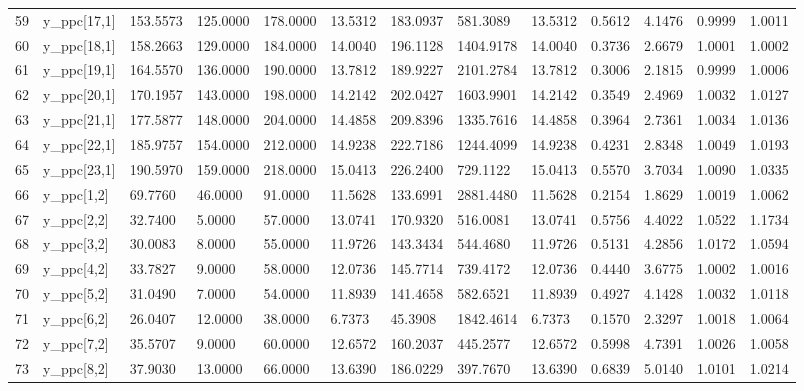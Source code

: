 \begin{table}[ht]
\begin{tabular}{rllllllllllll}
  59 & y\_ppc[17,1] & 153.5573 &  125.0000 & 178.0000 &  13.5312 &   183.0937 &  581.3089 &  13.5312 &  0.5612 &  4.1476 & 0.9999 &  1.0011 \\ 
  60 & y\_ppc[18,1] & 158.2663 &  129.0000 & 184.0000 &  14.0040 &   196.1128 & 1404.9178 &  14.0040 &  0.3736 &  2.6679 & 1.0001 &  1.0002 \\ 
  61 & y\_ppc[19,1] & 164.5570 &  136.0000 & 190.0000 &  13.7812 &   189.9227 & 2101.2784 &  13.7812 &  0.3006 &  2.1815 & 0.9999 &  1.0006 \\ 
  62 & y\_ppc[20,1] & 170.1957 &  143.0000 & 198.0000 &  14.2142 &   202.0427 & 1603.9901 &  14.2142 &  0.3549 &  2.4969 & 1.0032 &  1.0127 \\ 
  63 & y\_ppc[21,1] & 177.5877 &  148.0000 & 204.0000 &  14.4858 &   209.8396 & 1335.7616 &  14.4858 &  0.3964 &  2.7361 & 1.0034 &  1.0136 \\ 
  64 & y\_ppc[22,1] & 185.9757 &  154.0000 & 212.0000 &  14.9238 &   222.7186 & 1244.4099 &  14.9238 &  0.4231 &  2.8348 & 1.0049 &  1.0193 \\ 
  65 & y\_ppc[23,1] & 190.5970 &  159.0000 & 218.0000 &  15.0413 &   226.2400 &  729.1122 &  15.0413 &  0.5570 &  3.7034 & 1.0090 &  1.0335 \\ 
  66 & y\_ppc[1,2] &  69.7760 &   46.0000 &  91.0000 &  11.5628 &   133.6991 & 2881.4480 &  11.5628 &  0.2154 &  1.8629 & 1.0019 &  1.0062 \\ 
  67 & y\_ppc[2,2] &  32.7400 &    5.0000 &  57.0000 &  13.0741 &   170.9320 &  516.0081 &  13.0741 &  0.5756 &  4.4022 & 1.0522 &  1.1734 \\ 
  68 & y\_ppc[3,2] &  30.0083 &    8.0000 &  55.0000 &  11.9726 &   143.3434 &  544.4680 &  11.9726 &  0.5131 &  4.2856 & 1.0172 &  1.0594 \\ 
  69 & y\_ppc[4,2] &  33.7827 &    9.0000 &  58.0000 &  12.0736 &   145.7714 &  739.4172 &  12.0736 &  0.4440 &  3.6775 & 1.0002 &  1.0016 \\ 
  70 & y\_ppc[5,2] &  31.0490 &    7.0000 &  54.0000 &  11.8939 &   141.4658 &  582.6521 &  11.8939 &  0.4927 &  4.1428 & 1.0032 &  1.0118 \\ 
  71 & y\_ppc[6,2] &  26.0407 &   12.0000 &  38.0000 &   6.7373 &    45.3908 & 1842.4614 &   6.7373 &  0.1570 &  2.3297 & 1.0018 &  1.0064 \\ 
  72 & y\_ppc[7,2] &  35.5707 &    9.0000 &  60.0000 &  12.6572 &   160.2037 &  445.2577 &  12.6572 &  0.5998 &  4.7391 & 1.0026 &  1.0058 \\ 
  73 & y\_ppc[8,2] &  37.9030 &   13.0000 &  66.0000 &  13.6390 &   186.0229 &  397.7670 &  13.6390 &  0.6839 &  5.0140 & 1.0101 &  1.0214 \\ 

\end{tabular}
\end{table}
